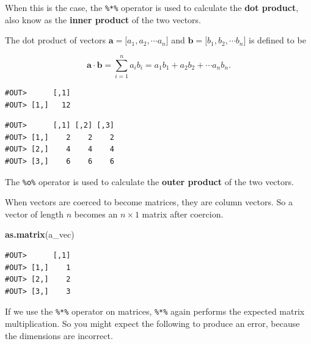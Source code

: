\documentclass[]{book}
\newenvironment{Shaded}{\begin{snugshade}}{\end{snugshade}}
\newcommand{\KeywordTok}[1]{\textcolor[rgb]{0.13,0.29,0.53}{\textbf{#1}}}
\newcommand{\StringTok}[1]{\textcolor[rgb]{0.31,0.60,0.02}{#1}}
\newcommand{\CommentTok}[1]{\textcolor[rgb]{0.56,0.35,0.01}{\textit{#1}}}
\newcommand{\OperatorTok}[1]{\textcolor[rgb]{0.81,0.36,0.00}{\textbf{#1}}}
\newcommand{\NormalTok}[1]{#1}
\theoremstyle{definition}
\theoremstyle{definition}
\theoremstyle{definition}
\theoremstyle{remark}
\begin{document}
When this is the case, the \texttt{\%*\%} operator is used to calculate
the \textbf{dot product}, also know as the \textbf{inner product} of the
two vectors.

The dot product of vectors
\(\boldsymbol{a} = \lbrack a_1, a_2, \cdots a_n \rbrack\) and
\(\boldsymbol{b} = \lbrack b_1, b_2, \cdots b_n \rbrack\) is defined to
be

\[
\boldsymbol{a} \cdot \boldsymbol{b} = \sum_{i = 1}^{n} a_i b_i = a_1 b_1 + a_2 b_2 + \cdots a_n b_n.
\]

\begin{Shaded}
\end{Shaded}

\begin{verbatim}
#OUT>      [,1]
#OUT> [1,]   12
\end{verbatim}

\begin{Shaded}
\end{Shaded}

\begin{verbatim}
#OUT>      [,1] [,2] [,3]
#OUT> [1,]    2    2    2
#OUT> [2,]    4    4    4
#OUT> [3,]    6    6    6
\end{verbatim}

The \texttt{\%o\%} operator is used to calculate the \textbf{outer
product} of the two vectors.

When vectors are coerced to become matrices, they are column vectors. So
a vector of length \(n\) becomes an \(n \times 1\) matrix after
coercion.

\begin{Shaded}
\begin{Highlighting}[]
\KeywordTok{as.matrix}\NormalTok{(a_vec)}
\end{Highlighting}
\end{Shaded}

\begin{verbatim}
#OUT>      [,1]
#OUT> [1,]    1
#OUT> [2,]    2
#OUT> [3,]    3
\end{verbatim}

If we use the \texttt{\%*\%} operator on matrices, \texttt{\%*\%} again
performs the expected matrix multiplication. So you might expect the
following to produce an error, because the dimensions are incorrect.
\end{document}
